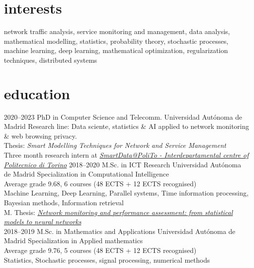 \documentclass[]{friggeri-cv}
\begin{document}
\section{interests}

network traffic analysis, service monitoring and management, data analysis, mathematical modelling, statistics, probability theory, stochastic processes, machine learning, deep learning, mathematical optimization, regularization techniques, distributed systems

\section{education}

\begin{entrylist}
\entry
    {2020–2023}
    {PhD in Computer Science and Telecomm.}
    {Universidad Autónoma de Madrid}
    {Research line: Data sciente, statistics \& AI applied to network monitoring \& web browsing privacy.\\
    Thesis: \emph{Smart Modelling Techniques for Network and Service Management}\\
    Three month research intern at \href{https://smartdata.polito.it/}{\emph{SmartData@PoliTo - Interdepartamental centre of Politecnico di Torino}}
    }
\entry
    {2018–2020}
    {M.Sc. in ICT Research}
    {Universidad Autónoma de Madrid}
    {Specialization in Computational Intelligence\\
    Average grade 9.68, 6 courses (48 ECTS + 12 ECTS recognised) \\
    Machine Learning, Deep Learning, Parallel systems, Time information processing, Bayesian methods, Information retrieval \\
    M. Thesis: \href{https://repositorio.uam.es/bitstream/handle/10486/692579/perdices_burrero_daniel_tfm.pdf?sequence=1&isAllowed=y}{\emph{Network monitoring and performance assessment: from statistical models to neural networks}}\\%
    }
  \entry
    {2018–2019}
    {M.Sc. in Mathematics and Applications}
    {Universidad Autónoma de Madrid}
    {Specialization in Applied mathematics\\
    Average grade 9.76, 5 courses (48 ECTS + 12 ECTS recognised)\\
    Statistics, Stochastic processes, signal processing, numerical methods\\
}
\end{entrylist}
\end{document}
